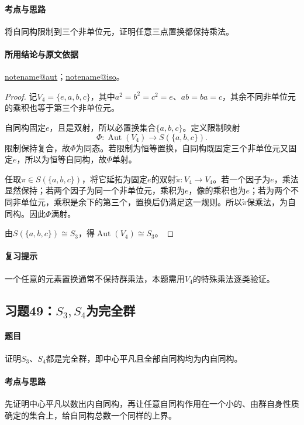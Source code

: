 \documentclass[UTF8,a4paper,11pt,fontset=windows]{ctexart}
\makeatletter
\DeclareMathOperator{\Aut}{Aut}\DeclareMathOperator{\Inn}{Inn}
\newcommand{\noteref}[1]{\hyperref[note:#1]{\csname notename@#1\endcsname}}
\newcommand{\exref}[2]{\hyperref[ex:#1:#2]{第#1章习题#2}}
\makeatother
\begin{document}
\paragraph{考点与思路}
将自同构限制到三个非单位元，证明任意三点置换都保持乘法。

\paragraph{所用结论与原文依据}
\noteref{aut}；\noteref{iso}。


\begin{proof}
记$V_4=\{e,a,b,c\}$，其中$a^2=b^2=c^2=e$、$ab=ba=c$，其余不同非单位元的乘积也等于第三个非单位元。

自同构固定$e$，且是双射，所以必置换集合$\{a,b,c\}$。定义限制映射
\[
\Phi:\Aut(V_4)\to S(\{a,b,c\}).
\]
限制保持复合，故$\Phi$为同态。若限制为恒等置换，自同构既固定三个非单位元又固定$e$，所以为恒等自同构，故$\Phi$单射。

任取$\pi\in S(\{a,b,c\})$，将它延拓为固定$e$的双射$\widetilde\pi:V_4\to V_4$。若一个因子为$e$，乘法显然保持；若两个因子为同一个非单位元，乘积为$e$，像的乘积也为$e$；若为两个不同非单位元，乘积是余下的第三个，置换后仍满足这一规则。所以$\widetilde\pi$保乘法，为自同构。因此$\Phi$满射。

由$S(\{a,b,c\})\cong S_3$，得$\Aut(V_4)\cong S_3$。
\end{proof}

\paragraph{复习提示}
一个任意的元素置换通常不保持群乘法，本题需用$V_4$的特殊乘法逐类验证。


\subsection{习题49：\texorpdfstring{$S_3,S_4$为完全群}{S3,S4为完全群}}
\label{ex:2:49}

\paragraph{题目}
证明$S_3$、$S_4$都是完全群，即中心平凡且全部自同构均为内自同构。

\paragraph{考点与思路}
先证明中心平凡以数出内自同构，再让任意自同构作用在一个小的、由群自身性质确定的集合上，给自同构总数一个同样的上界。
\end{document}
